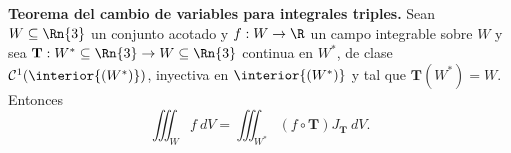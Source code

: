 \begin{theorem}
    \textbf{Teorema del cambio de variables para integrales triples.}  Sean $W \subseteq\Rn{3}$ un conjunto acotado y  $f:W \to\R$ un campo integrable sobre $W$ y sea $\mathbf{T}:W^*\subseteq\Rn{3}\to W\subseteq\Rn{3}$ continua en $W^*$, de clase $\mathcal{C}^1(\interior{(W^*)})$,  inyectiva en $\interior{(W^*)}$ y tal que $\mathbf{T}(W^*)=W$.  Entonces
    \[
        \iiint_W f\:dV=\iiint_{W^*}(f\circ\mathbf{T})J_\mathbf{T}\:dV.
    \]
\end{theorem}







